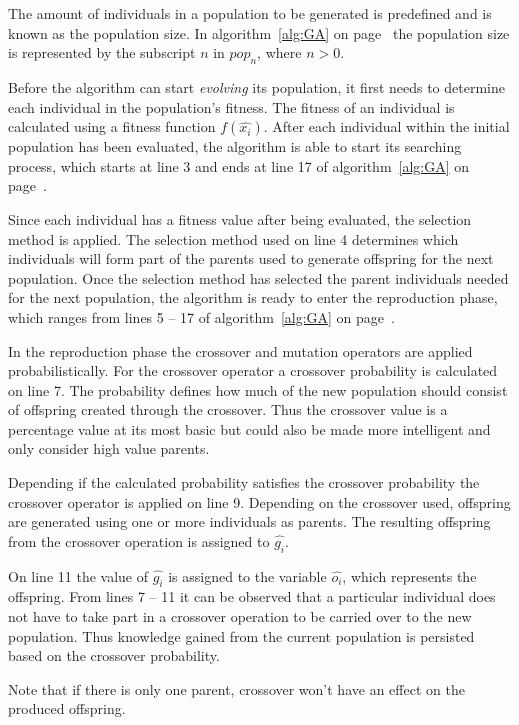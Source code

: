 The amount of individuals in a population to be generated is predefined and is known as the population size. In algorithm~\ref{alg:GA} on page~\pageref{alg:GA} the population size is represented by the subscript $n$ in $pop_n$, where $n > 0$.

Before the algorithm can start \emph{evolving} its population, it first needs to determine each individual in the population's fitness. The fitness of an individual is calculated using a fitness function $f(\hat{x_i})$. After each individual within the initial population has been evaluated, the algorithm is able to start its searching process, which starts at line 3 and ends at line 17 of algorithm~\ref{alg:GA} on page~\pageref{alg:GA}.

Since each individual has a fitness value after being evaluated, the selection method is applied. The selection method used on line 4 determines which individuals will form part of the parents used to generate offspring for the next population. Once the selection method has selected the parent individuals needed for the next population, the algorithm is ready to enter the reproduction phase, which ranges from lines 5 -- 17 of algorithm~\ref{alg:GA} on page~\pageref{alg:GA}.

In the reproduction phase the crossover and mutation operators are applied probabilistically. For the crossover operator a crossover probability is calculated on line 7. The probability defines how much of the new population should consist of offspring created through the crossover. Thus the crossover value is a percentage value at its most basic but could also be made more intelligent and only consider high value parents. 

Depending if the calculated probability satisfies the crossover probability the crossover operator is applied on line 9. Depending on the crossover used, offspring are generated using one or more individuals as parents. The resulting offspring from the crossover operation is assigned to $\hat{g_i}$.

On line 11 the value of $\hat{g_i}$ is assigned to the variable $\hat{o_i}$, which represents the offspring. From lines 7 -- 11 it can be observed that a particular individual does not have to take part in a crossover operation to be carried over to the new population. Thus knowledge gained from the current population is persisted based on the crossover probability.

Note that if there is only one parent, crossover won't have an effect on the produced offspring\cite{CompuIntelligenceIntro}.

